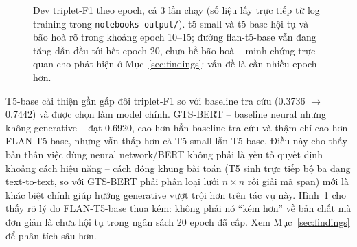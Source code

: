 \documentclass[11pt,a4paper]{article}
\begin{document}
\begin{figure}[h]
\centering
{}
\caption{Dev triplet-F1 theo epoch, cả 3 lần chạy (số liệu lấy trực tiếp từ
log training trong \texttt{notebooks-\allowbreak output/\allowbreak }). t5-small và t5-base hội tụ
và bão hoà rõ trong khoảng epoch 10--15; đường flan-t5-base vẫn đang tăng
dần đều tới hết epoch 20, chưa hề bão hoà -- minh chứng trực quan cho
phát hiện ở Mục~\ref{sec:findings}: vấn đề là cần nhiều epoch hơn.}
\label{fig:triplet-f1-curves}
\end{figure}

T5-base cải thiện gần gấp đôi triplet-F1 so với baseline tra cứu
(0.3736 $\to$ 0.7442) và được chọn làm model chính. GTS-BERT -- baseline
neural nhưng không generative -- đạt 0.6920, cao hơn hẳn baseline tra cứu
và thậm chí cao hơn FLAN-T5-base, nhưng vẫn thấp hơn cả T5-small lẫn
T5-base. Điều này cho thấy bản thân việc dùng neural network/BERT không
phải là yếu tố quyết định khoảng cách hiệu năng -- cách đóng khung bài
toán (T5 sinh trực tiếp bộ ba dạng text-to-text, so với GTS-BERT phải
phân loại lưới $n \times n$ rồi giải mã span) mới là khác biệt chính giúp
hướng generative vượt trội hơn trên tác vụ này. Hình~\ref{fig:triplet-f1-curves}
cho thấy rõ lý do FLAN-T5-base thua kém: không phải nó ``kém hơn'' về bản
chất mà đơn giản là chưa hội tụ trong ngân sách 20 epoch đã cấp. Xem
Mục~\ref{sec:findings} để phân tích sâu hơn.
\end{document}
